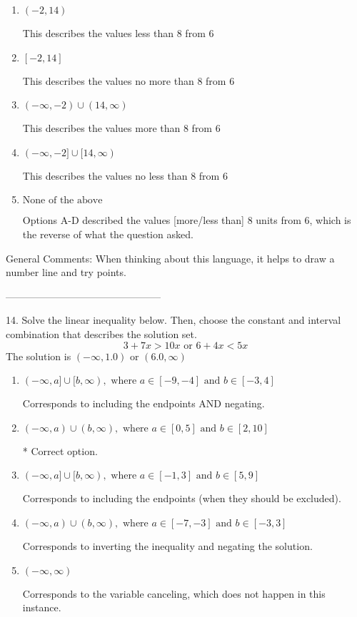 \documentclass{article}[14pt]
\begin{document}
\begin{enumerate}[label=\Alph*.] 
\item $ (-2, 14) $ 

 This describes the values less than 8 from 6 
\item $ [-2, 14] $ 

 This describes the values no more than 8 from 6 
\item $ (-\infty, -2) \cup (14, \infty) $ 

 This describes the values more than 8 from 6 
\item $ (-\infty, -2] \cup [14, \infty) $ 

 This describes the values no less than 8 from 6 
\item $ \text{None of the above} $ 

 Options A-D described the values [more/less than] 8 units from 6, which is the reverse of what the question asked. 
\end{enumerate} 
 
General Comments: When thinking about this language, it helps to draw a number line and try points.

-----------------------------------------------

14. Solve the linear inequality below. Then, choose the constant and interval combination that describes the solution set.
$$ 3 + 7 x > 10 x \text{ or } 6 + 4 x < 5 x $$ 
The solution is $ (-\infty, 1.0) \text{ or } (6.0, \infty) $ 

\begin{enumerate}[label=\Alph*.] 
\item $ (-\infty, a] \cup [b, \infty), \text{ where } a \in [-9, -4] \text{ and } b \in [-3, 4] $ 

 Corresponds to including the endpoints AND negating. 
\item $ (-\infty, a) \cup (b, \infty), \text{ where } a \in [0, 5] \text{ and } b \in [2, 10] $ 

  * Correct option. 
\item $ (-\infty, a] \cup [b, \infty), \text{ where } a \in [-1, 3] \text{ and } b \in [5, 9] $ 

 Corresponds to including the endpoints (when they should be excluded). 
\item $ (-\infty, a) \cup (b, \infty), \text{ where } a \in [-7, -3] \text{ and } b \in [-3, 3] $ 

 Corresponds to inverting the inequality and negating the solution. 
\item $ (-\infty, \infty) $ 

 Corresponds to the variable canceling, which does not happen in this instance. 
\end{enumerate} 
 
\end{document}
